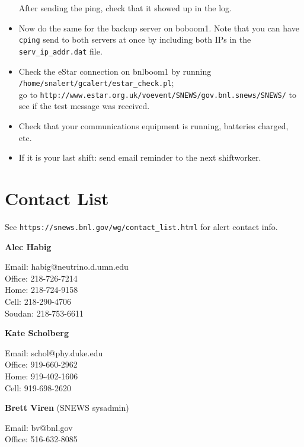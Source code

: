 \documentclass{article}
\begin{document}
\begin{itemize}
After sending the ping, check that it showed up in the log. 

\item Now do the same for the backup server on boboom1.  Note that you 
can have \texttt{cping}
send to both servers at once by including both IPs in the 
\texttt{serv\_ip\_addr.dat} file.

\item Check the eStar connection on bnlboom1 by running\\
\texttt{/home/snalert/gcalert/estar\_check.pl};\\ go to
\texttt{http://www.estar.org.uk/voevent/SNEWS/gov.bnl.snews/SNEWS/} to see
if the test message was received.

\item Check that your communications equipment is running,
batteries charged, etc.

\item If it is your last shift: send email reminder to the
next shiftworker.

\end{itemize}

\newpage

\section{Contact List}      


See \texttt{https://snews.bnl.gov/wg/contact\_list.html} for 
alert contact info.\\
\vspace{0.05in}

\noindent
\textbf{Alec Habig}

\noindent
Email: habig@neutrino.d.umn.edu\\
Office: 218-726-7214\\
Home: 218-724-9158\\
Cell: 218-290-4706\\
Soudan: 218-753-6611\\

\vspace{0.05in}

\noindent
\textbf{Kate Scholberg}

\noindent
Email: schol@phy.duke.edu\\
Office: 919-660-2962\\
Home: 919-402-1606 \\
Cell: 919-698-2620\\

\vspace{0.05in}

\noindent
\textbf{Brett Viren} (SNEWS sysadmin)

\noindent
Email: bv@bnl.gov\\
Office: 516-632-8085\\
\end{document}
